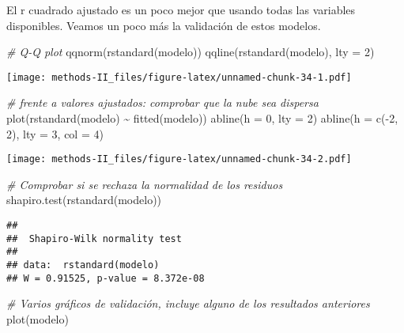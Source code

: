 \documentclass[
]{article}
\newenvironment{Shaded}{\begin{snugshade}}{\end{snugshade}}
\newcommand{\AttributeTok}[1]{\textcolor[rgb]{0.77,0.63,0.00}{#1}}
\newcommand{\CommentTok}[1]{\textcolor[rgb]{0.56,0.35,0.01}{\textit{#1}}}
\newcommand{\DecValTok}[1]{\textcolor[rgb]{0.00,0.00,0.81}{#1}}
\newcommand{\FunctionTok}[1]{\textcolor[rgb]{0.00,0.00,0.00}{#1}}
\newcommand{\NormalTok}[1]{#1}
\newcommand{\SpecialCharTok}[1]{\textcolor[rgb]{0.00,0.00,0.00}{#1}}
\begin{document}
El r cuadrado ajustado es un poco mejor que usando todas las variables
disponibles. Veamos un poco más la validación de estos modelos.

\begin{Shaded}
\begin{Highlighting}[]
\CommentTok{\# Q{-}Q plot}
\FunctionTok{qqnorm}\NormalTok{(}\FunctionTok{rstandard}\NormalTok{(modelo))}
\FunctionTok{qqline}\NormalTok{(}\FunctionTok{rstandard}\NormalTok{(modelo), }\AttributeTok{lty =} \DecValTok{2}\NormalTok{)}
\end{Highlighting}
\end{Shaded}

\texttt{[image: methods-II\_files/figure-latex/unnamed-chunk-34-1.pdf]}

\begin{Shaded}
\begin{Highlighting}[]
\CommentTok{\# frente a valores ajustados: comprobar que la nube sea dispersa}
\FunctionTok{plot}\NormalTok{(}\FunctionTok{rstandard}\NormalTok{(modelo) }\SpecialCharTok{\textasciitilde{}} \FunctionTok{fitted}\NormalTok{(modelo))}
\FunctionTok{abline}\NormalTok{(}\AttributeTok{h =} \DecValTok{0}\NormalTok{, }\AttributeTok{lty =} \DecValTok{2}\NormalTok{)}
\FunctionTok{abline}\NormalTok{(}\AttributeTok{h =} \FunctionTok{c}\NormalTok{(}\SpecialCharTok{{-}}\DecValTok{2}\NormalTok{, }\DecValTok{2}\NormalTok{), }\AttributeTok{lty =} \DecValTok{3}\NormalTok{, }\AttributeTok{col =} \DecValTok{4}\NormalTok{)}
\end{Highlighting}
\end{Shaded}

\texttt{[image: methods-II\_files/figure-latex/unnamed-chunk-34-2.pdf]}

\begin{Shaded}
\begin{Highlighting}[]
\CommentTok{\# Comprobar si se rechaza la normalidad de los residuos}
\FunctionTok{shapiro.test}\NormalTok{(}\FunctionTok{rstandard}\NormalTok{(modelo))}
\end{Highlighting}
\end{Shaded}

\begin{verbatim}
## 
##  Shapiro-Wilk normality test
## 
## data:  rstandard(modelo)
## W = 0.91525, p-value = 8.372e-08
\end{verbatim}

\begin{Shaded}
\begin{Highlighting}[]
\CommentTok{\# Varios gráficos de validación, incluye alguno de los resultados anteriores}
\FunctionTok{plot}\NormalTok{(modelo)}
\end{Highlighting}
\end{Shaded}
\end{document}
